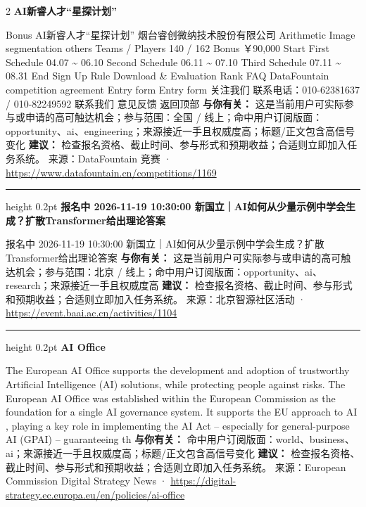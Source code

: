 \documentclass[10.5pt]{ctexart}
\begin{document}
\begin{multicols}{2}
{\large\bfseries AI新睿人才“星探计划”}\par
Bonus AI新睿人才“星探计划” 烟台睿创微纳技术股份有限公司 Arithmetic Image segmentation others Teams / Players 140 / 162 Bonus ￥90,000 Start First Schedule 04.07 \textasciitilde{} 06.10 Second Schedule 06.11 \textasciitilde{} 07.10 Third Schedule 07.11 \textasciitilde{} 08.31 End Sign Up Rule Download \& Evaluation Rank FAQ DataFountain competition agreement Entry form Entry form 关注我们 联系电话：010-62381637 / 010-82249592 联系我们 意见反馈 返回顶部
\textbf{与你有关：} 这是当前用户可实际参与或申请的高可触达机会；参与范围：全国 / 线上；命中用户订阅版面：opportunity、ai、engineering；来源接近一手且权威度高；标题/正文包含高信号变化
\textbf{建议：} 检查报名资格、截止时间、参与形式和预期收益；合适则立即加入任务系统。
{\footnotesize\color{ormuted} 来源：DataFountain 竞赛 · \url{https://www.datafountain.cn/competitions/1169}}
\vspace{2mm}
\hrule height 0.2pt
\vspace{2mm}
{\large\bfseries 报名中 2026-11-19 10:30:00 新国立｜AI如何从少量示例中学会生成？扩散Transformer给出理论答案}\par
报名中 2026-11-19 10:30:00 新国立｜AI如何从少量示例中学会生成？扩散Transformer给出理论答案
\textbf{与你有关：} 这是当前用户可实际参与或申请的高可触达机会；参与范围：北京 / 线上；命中用户订阅版面：opportunity、ai、research；来源接近一手且权威度高
\textbf{建议：} 检查报名资格、截止时间、参与形式和预期收益；合适则立即加入任务系统。
{\footnotesize\color{ormuted} 来源：北京智源社区活动 · \url{https://event.baai.ac.cn/activities/1104}}
\vspace{2mm}
\hrule height 0.2pt
\vspace{2mm}
{\large\bfseries AI Office}\par
The European AI Office supports the development and adoption of trustworthy Artificial Intelligence (AI) solutions, while protecting people against risks. The European AI Office was established within the European Commission as the foundation for a single AI governance system. It supports the EU approach to AI , playing a key role in implementing the AI Act – especially for general-purpose AI (GPAI) – guaranteeing th
\textbf{与你有关：} 命中用户订阅版面：world、business、ai；来源接近一手且权威度高；标题/正文包含高信号变化
\textbf{建议：} 检查报名资格、截止时间、参与形式和预期收益；合适则立即加入任务系统。
{\footnotesize\color{ormuted} 来源：European Commission Digital Strategy News · \url{https://digital-strategy.ec.europa.eu/en/policies/ai-office}}

\end{multicols}
\end{document}
